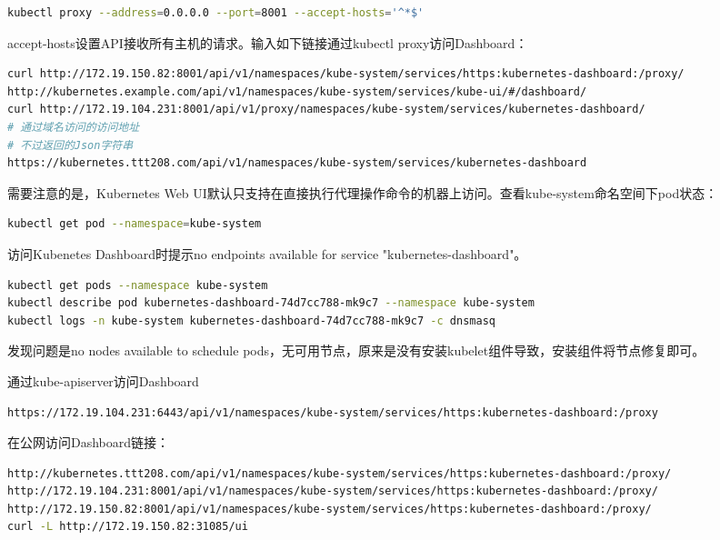 \documentclass[8pt]{book}
\makeatletter
\numberwithin{dummy}{section}
\theoremstyle{ocrenumbox}
\theoremstyle{blacknumex}
\theoremstyle{blacknumbox}
\theoremstyle{ocrenum}
\renewcommand{\subsubsection}{\@startsection {subsubsection}{3}{\z@}
	{-2ex \@plus -0.1ex \@minus -.2ex}
	{.2ex \@plus.2ex }
	{\normalfont\small\sffamily\bfseries}}
\newlength\esp
\makeatother
\begin{document}
\begin{lstlisting}[language=Bash]
kubectl proxy --address=0.0.0.0 --port=8001 --accept-hosts='^*$'
\end{lstlisting}

accept-hosts设置API接收所有主机的请求。输入如下链接通过kubectl proxy访问Dashboard：

\begin{lstlisting}[language=Bash]
curl http://172.19.150.82:8001/api/v1/namespaces/kube-system/services/https:kubernetes-dashboard:/proxy/
http://kubernetes.example.com/api/v1/namespaces/kube-system/services/kube-ui/#/dashboard/
curl http://172.19.104.231:8001/api/v1/proxy/namespaces/kube-system/services/kubernetes-dashboard/
# 通过域名访问的访问地址
# 不过返回的Json字符串
https://kubernetes.ttt208.com/api/v1/namespaces/kube-system/services/kubernetes-dashboard
\end{lstlisting}

需要注意的是，Kubernetes Web UI默认只支持在直接执行代理操作命令的机器上访问。查看kube-system命名空间下pod状态：

\begin{lstlisting}[language=Bash]
kubectl get pod --namespace=kube-system
\end{lstlisting}

访问Kubenetes Dashboard时提示no endpoints available for service "kubernetes-dashboard"。

\begin{lstlisting}[language=Bash]
kubectl get pods --namespace kube-system
kubectl describe pod kubernetes-dashboard-74d7cc788-mk9c7 --namespace kube-system
kubectl logs -n kube-system kubernetes-dashboard-74d7cc788-mk9c7 -c dnsmasq
\end{lstlisting}

发现问题是no nodes available to schedule pods，无可用节点，原来是没有安装kubelet组件导致，安装组件将节点修复即可。

\subsubsection{通过kube-apiserver访问Dashboard}

\begin{lstlisting}[language=Bash]
https://172.19.104.231:6443/api/v1/namespaces/kube-system/services/https:kubernetes-dashboard:/proxy
\end{lstlisting}

在公网访问Dashboard链接：

\begin{lstlisting}[language=Bash]
http://kubernetes.ttt208.com/api/v1/namespaces/kube-system/services/https:kubernetes-dashboard:/proxy/
http://172.19.104.231:8001/api/v1/namespaces/kube-system/services/https:kubernetes-dashboard:/proxy/
http://172.19.150.82:8001/api/v1/namespaces/kube-system/services/https:kubernetes-dashboard:/proxy/
curl -L http://172.19.150.82:31085/ui
\end{lstlisting}
\end{document}
